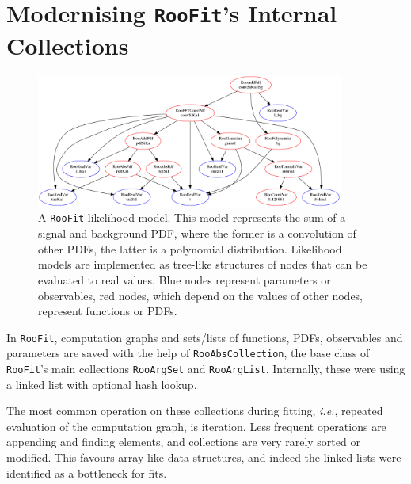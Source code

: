 \documentclass[a4paper]{jpconf}
\newcommand{\RooFit}{\texttt{RooFit}\xspace}
\newcommand{\ie}{\textit{i.e.}\xspace}
\begin{document}
\section{Modernising \RooFit's Internal Collections\label{sec:STLCollections}}
\begin{figure}[t]
\centering
\includegraphics[width=0.9\textwidth]{image1.png}
\caption{\label{PDFTree}A \RooFit likelihood model\protect\footnotemark. This model represents the sum of a signal and background PDF,
where the former is a convolution of other PDFs, the latter is a polynomial distribution.
Likelihood models are implemented as tree-like structures of nodes that can be evaluated to real values.
Blue nodes represent parameters or observables, red nodes, which depend on the values of other nodes, represent functions or PDFs.
}
\end{figure}
In \RooFit, computation graphs and sets/lists of functions, PDFs, observables and parameters are saved with the help of \texttt{RooAbsCollection},
the base class of \RooFit's main collections \texttt{RooArgSet} and \texttt{RooArgList}. Internally, these were using a
linked list with optional hash lookup.

The most common operation on these collections during fitting, \ie, repeated evaluation of the computation graph,
is iteration. Less frequent operations are appending and finding elements, and collections are very rarely sorted
or modified. This favours array-like data structures, and indeed 
the linked lists were identified as a bottleneck for fits.
\end{document}
